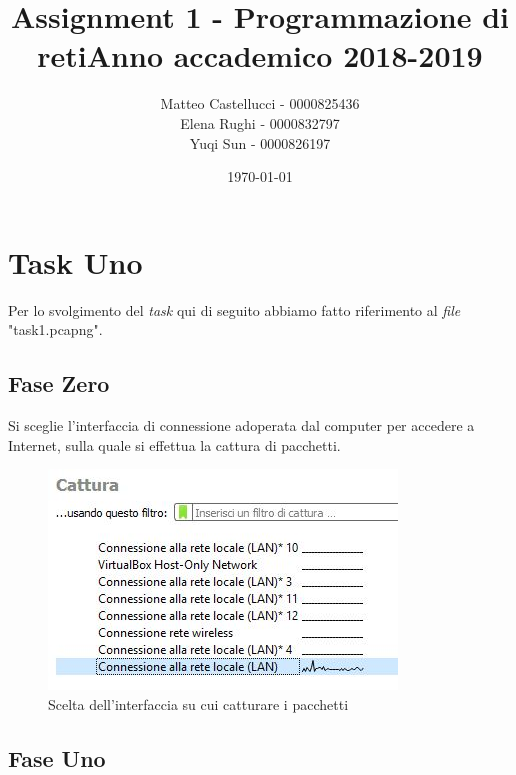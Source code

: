\documentclass[a4paper, 12pt]{report}
\title{Assignment 1 - Programmazione di reti\newline Anno accademico 2018-2019}
\date{\today}
\author{Matteo Castellucci - 0000825436\\Elena Rughi - 0000832797\\Yuqi Sun - 0000826197\newline}
\begin{document}
\maketitle

\tableofcontents

\chapter{Task Uno}

Per lo svolgimento del \textit{task} qui di seguito abbiamo fatto riferimento al \textit{file} "task1.pcapng".

\section{Fase Zero}

Si sceglie l’interfaccia di connessione adoperata dal computer per accedere a Internet, sulla quale si effettua la cattura di pacchetti.

\begin{figure}[H]
	\centering
	\includegraphics[width=\linewidth]{images/image1_1.png}
	\caption{Scelta dell'interfaccia su cui catturare i pacchetti}
\end{figure}
 
\section{Fase Uno}
\end{document}
